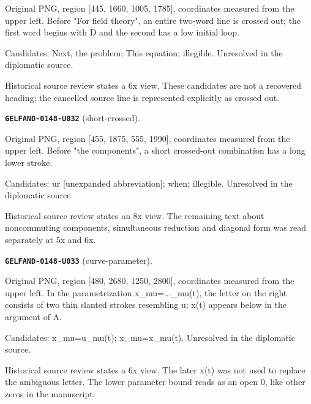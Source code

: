 \documentclass[11pt]{article}
\theoremstyle{definition}
\theoremstyle{remark}
\begin{document}
Original PNG, region [445, 1660, 1005, 1785], coordinates measured from the upper left. Before "For field theory", an entire two-word line is crossed out; the first word begins with D and the second has a low initial loop.\par
Candidates: Next, the problem; This equation; illegible. Unresolved in the diplomatic source.\par
Historical source review states a 6x view. These candidates are not a recovered heading; the cancelled source line is represented explicitly as crossed out.\par\medskip
\noindent\leavevmode{}\label{GELFAND-P001366:short-crossed:note}\textbf{\texttt{GELFAND-0148-U032}} (short-crossed).\par\nopagebreak[4]
Original PNG, region [455, 1875, 555, 1990], coordinates measured from the upper left. Before "the components", a short crossed-out combination has a long lower stroke.\par
Candidates: ur [unexpanded abbreviation]; when; illegible. Unresolved in the diplomatic source.\par
Historical source review states an 8x view. The remaining text about noncommuting components, simultaneous reduction and diagonal form was read separately at 5x and 6x.\par\medskip
\noindent\leavevmode{}\label{GELFAND-P001366:curve-parameter:note}\textbf{\texttt{GELFAND-0148-U033}} (curve-parameter).\par\nopagebreak[4]
Original PNG, region [480, 2680, 1250, 2800], coordinates measured from the upper left. In the parametrization x\_mu=...\_mu(t), the letter on the right consists of two thin slanted strokes resembling u; x(t) appears below in the argument of A.\par
Candidates: x\_mu=u\_mu(t); x\_mu=x\_mu(t). Unresolved in the diplomatic source.\par
Historical source review states a 6x view. The later x(t) was not used to replace the ambiguous letter. The lower parameter bound reads as an open 0, like other zeros in the manuscript.\par\medskip
\end{document}
